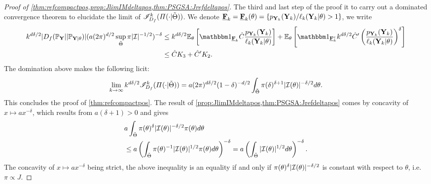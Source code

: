 \begin{proof}[Proof of \cref{thm:refcompactpos,prop:JlimIMdeltapos,thm:PSGSA:Jrefdeltapos}]
The third and last step of the proof it to carry out a dominated convergence theorem to elucidate the limit of $\mathscr{I}_{D_f}^k(\varPi(\cdot|\tilde\Theta))$.
We denote $\underline{\mathbf{F}}_k= \underline{\mathbf{F}}_k(\theta)=\{p_{\mathbf{Y}_k}(\mathbf{Y}_k)/\ell_k(\mathbf{Y}_k|\theta)>1\}$, %
    we write
    \begin{align}
\nonumber       k^{d\delta/2}|D_f(\PP_{\mbf Y}||\PP_{\mbf Y|\theta}) | (a(2\pi)^{d/2}\sup_{\tilde\Theta}\pi|\cI|^{-1/2})^{-\delta}  
    &\leq k^{d\delta/2}\EE_\theta\left[\indic_{\ubf F_k}\hat C\frac{p_{\mbf Y_k}(\mbf Y_k)}{\ell_k(\mbf Y_k|\theta)}\right] + \EE_\theta\left[\indic_{\ubf F_k^c}k^{d\delta/2}\hat C'\left(\frac{p_{\mbf Y_k}(\mbf Y_k)}{\ell_k(\mbf Y_k|\theta)}\right)^\delta \right] \\
                &\leq\hat CK_3 + \hat C'K_2. %
    \end{align}
The domination above makes the following licit:
    \begin{equation}
        \lim_{k\rightarrow\infty} k^{d\delta/2}\mathscr{I}^k_{D_f}(\varPi(\cdot|\tilde\Theta))  = a(2\pi)^{d\delta/2}(1-\delta)^{-d/2} \int_{\tilde\Theta}\pi(\delta)^{\delta+1}|\mathcal{I}(\theta)|^{-\delta/2}d\theta.
    \end{equation}
This concludes the proof of \cref{thm:refcompactpos}. The result of \cref{prop:JlimIMdeltapos,thm:PSGSA:Jrefdeltapos} comes by 
concavity of $x\mapsto a x^{-\delta}$, which results from $a(\delta+1)>0$ and  gives
    \begin{align}
    \nonumber
        &a \int_{\tilde\Theta}\pi(\theta)^\delta |\mathcal{I}(\theta)|^{-\delta/2}\pi(\theta)d\theta \\
            &\leq a\left(\int_{\tilde\Theta}\pi(\theta)^{-1}|\mathcal{I}(\theta)|^{1/2}\pi(\theta)d\theta\right)^{-\delta}
            = a \left(\int_{\tilde\Theta} |\mathcal{I}(\theta)|^{1/2} d\theta\right)^{-\delta}. \label{eq:concavinequality}
    \end{align}
The concavity of $x\mapsto a x^{-\delta}$ being strict, the above inequality is an equality if and only if 
$\pi(\theta)^\delta|\mathcal{I}(\theta)|^{-\delta/2}$ is constant with respect to  $\theta$, i.e. $\pi\propto J$.

\end{proof}


